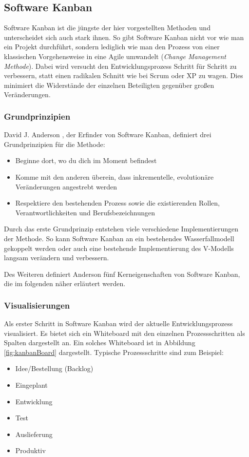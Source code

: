 \subsection{Software Kanban}
Software Kanban ist die jüngste der hier vorgestellten Methoden und unterscheidet sich auch stark ihnen. So gibt Software Kanban nicht vor wie man ein Projekt durchführt, sondern lediglich wie man den Prozess von einer klassischen Vorgehensweise in eine Agile umwandelt (\emph{Change Management Methode}). \cite[S. 14]{bib:wolfRoock} Dabei wird versucht den Entwicklungsprozess Schritt für Schritt zu verbessern, statt einen radikalen Schnitt wie bei Scrum oder XP zu wagen. Dies minimiert die Widerstände der einzelnen Beteiligten gegenüber großen Veränderungen. \cite{bib:ix2011}

\subsubsection{Grundprinzipien}
David J. Anderson \cite{bib:anderson}, der Erfinder von Software Kanban, definiert drei Grundprinzipien für die Methode:
\begin{itemize}
  \item Beginne dort, wo du dich im Moment befindest
  \item Komme mit den anderen überein, dass inkrementelle, evolutionäre Ver\-änder\-ungen angestrebt werden
  \item Respektiere den bestehenden Prozess sowie die existierenden Rollen, Verantwortlichkeiten und Berufsbezeichnungen
\end{itemize}

Durch das erste Grundprinzip entstehen viele verschiedene Implementierungen der Methode. So kann Software Kanban an ein bestehendes Wasserfallmodell gekoppelt werden oder auch eine bestehende Implementierung des V-Modells langsam verändern und verbessern.

Des Weiteren definiert Anderson fünf Kerneigenschaften von Software Kanban, die im folgenden näher erläutert werden.

\subsubsection{Visualisierungen}
Als erster Schritt in Software Kanban wird der aktuelle Entwicklungsprozess visualisiert. Es bietet sich ein Whiteboard mit den einzelnen Prozessschritten als Spalten dargestellt an. Ein solches Whiteboard ist in Abbildung \ref{fig:kanbanBoard} dargestellt. Typische Prozessschritte sind zum Beispiel:
\begin{itemize}
  \item Idee/Bestellung (Backlog)
  \item Eingeplant
  \item Entwicklung
  \item Test
  \item Auslieferung
  \item Produktiv
\end{itemize}

